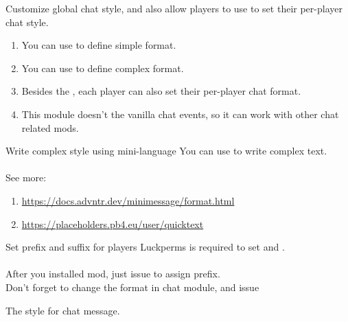 Customize global chat style, and also allow players to use  to set their per-player chat style.


\begin{enumerate}
    \item You can use  to define simple format.
    \item You can use  to define complex format.
    \item Besides the , each player can also set their per-player chat format.
    \item This module doesn't  the vanilla chat events, so it can work with other chat related mods.
\end{enumerate}

\begin{tips}{Write complex style using mini-language}
    You can use  to write complex text.\\
    \\
    See more:
    \begin{enumerate}
        \item \url{https://docs.advntr.dev/minimessage/format.html}
        \item \url{https://placeholders.pb4.eu/user/quicktext}
    \end{enumerate}
\end{tips}

\begin{note}{Set prefix and suffix for players}
    Luckperms is required to set  and . \\
    \\
    After you installed  mod, just issue  to assign prefix. \\
    Don't forget to change the format in chat module, and issue 
\end{note}

\begin{Configuration}

    \item[style]{
        The style for chat message.
    }

\end{Configuration}
